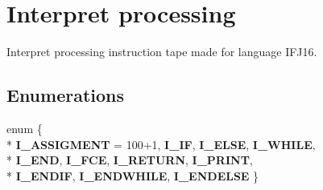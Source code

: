 \hypertarget{group__interpret__processing}{}\section{Interpret processing}
\label{group__interpret__processing}


Interpret processing instruction tape made for language I\+F\+J16.  


\subsection*{Enumerations}
\begin{DoxyCompactItemize}
\item 
enum \{ \\*
{\bfseries I\+\_\+\+A\+S\+S\+I\+G\+M\+E\+N\+T} = 100+1, 
{\bfseries I\+\_\+\+I\+F}, 
{\bfseries I\+\_\+\+E\+L\+S\+E}, 
{\bfseries I\+\_\+\+W\+H\+I\+L\+E}, 
\\*
{\bfseries I\+\_\+\+E\+N\+D}, 
{\bfseries I\+\_\+\+F\+C\+E}, 
{\bfseries I\+\_\+\+R\+E\+T\+U\+R\+N}, 
{\bfseries I\+\_\+\+P\+R\+I\+N\+T}, 
\\*
{\bfseries I\+\_\+\+E\+N\+D\+I\+F}, 
{\bfseries I\+\_\+\+E\+N\+D\+W\+H\+I\+L\+E}, 
{\bfseries I\+\_\+\+E\+N\+D\+E\+L\+S\+E}
 \}
\end{DoxyCompactItemize}
